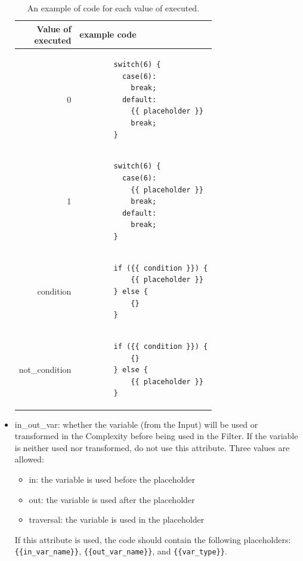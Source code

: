 \documentclass[12pt]{article}
\begin{document}
\begin{itemize}
    \begin{table}[H]
    \centering
    \begin{tabular}{|r|l|}
    \hline
      \makecell{Value of \\ executed}
      & example code \\
    \hline
    0 &
    \begin{minipage}{3in}
    \begin{verbatim}
        switch(6) {
          case(6):
            break;
          default:
            {{ placeholder }}
            break;
        }
    \end{verbatim}
    \end{minipage}
    \\
    \hline
    1 &
    \begin{minipage}{3in}
    \begin{verbatim}
        switch(6) {
          case(6):
            {{ placeholder }}
            break;
          default:
            break;
        }
    \end{verbatim}
    \end{minipage}
    \\
    \hline
    condition &
    \begin{minipage}{3in}
    \begin{verbatim}
        if ({{ condition }}) {
            {{ placeholder }}
        } else {
            {}
        }
    \end{verbatim}
    \end{minipage}
    \\
    \hline
    not\_condition &
    \begin{minipage}{3in}
    \begin{verbatim}
        if ({{ condition }}) {
            {}
        } else {
            {{ placeholder }}
        }
    \end{verbatim}
    \end{minipage}
    \\
    \hline
    \end{tabular}
    \caption{An example of code for each value of executed.}
    \label{tab:execution examples}
    \end{table}

    \item in\_out\_var: whether the variable (from the Input) will be used or
    transformed in the Complexity before being used in the Filter.  If the
    variable is neither used nor transformed, do not use this attribute.
    Three values are allowed:
    \begin{itemize}
        \item in: the variable is used before the placeholder 
        \item out: the variable is used after the placeholder
        \item traversal: the variable is used in the placeholder
    \end{itemize}
    If this attribute is used, the code should contain the following 
    placeholders: \\
    \verb|{{in_var_name}}|, \verb|{{out_var_name}}|, and \verb|{{var_type}}|.


\end{itemize}
\end{document}
